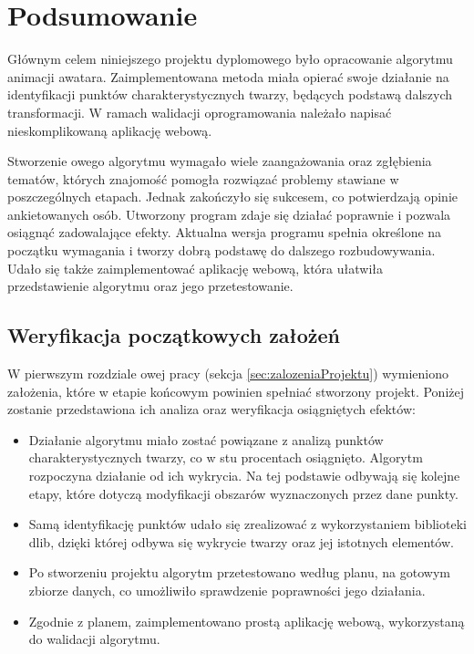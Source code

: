 \chapter{Podsumowanie}
\label{cha:podsumowanie}
Głównym celem niniejszego projektu dyplomowego było opracowanie algorytmu animacji awatara. Zaimplementowana metoda miała opierać swoje działanie na identyfikacji punktów charakterystycznych twarzy, będących podstawą dalszych transformacji. W ramach walidacji oprogramowania należało napisać nieskomplikowaną aplikację webową.

Stworzenie owego algorytmu wymagało wiele zaangażowania oraz zgłębienia tematów, których znajomość pomogła rozwiązać problemy stawiane w poszczególnych etapach. Jednak zakończyło się sukcesem, co potwierdzają opinie ankietowanych osób.  Utworzony program zdaje się działać poprawnie i pozwala osiągnąć zadowalające efekty. Aktualna wersja programu spełnia określone na początku wymagania i tworzy dobrą podstawę do dalszego rozbudowywania. Udało się także zaimplementować aplikację webową, która ułatwiła przedstawienie algorytmu oraz jego przetestowanie. 


\section{Weryfikacja początkowych założeń}
W pierwszym rozdziale owej pracy (sekcja \ref{sec:zalozeniaProjektu}) wymieniono założenia, które w etapie końcowym powinien spełniać stworzony projekt. Poniżej zostanie przedstawiona ich analiza oraz weryfikacja osiągniętych efektów:

\begin{itemize}
    \item Działanie algorytmu miało zostać powiązane z analizą punktów charakterystycznych twarzy, co w stu procentach osiągnięto. Algorytm rozpoczyna działanie od ich wykrycia. Na tej podstawie odbywają się kolejne etapy, które dotyczą modyfikacji obszarów wyznaczonych przez dane punkty.
    \item Samą identyfikację punktów udało się zrealizować z wykorzystaniem biblioteki dlib, dzięki której odbywa się wykrycie twarzy oraz jej istotnych elementów. 
    \item Po stworzeniu projektu algorytm przetestowano według planu, na gotowym zbiorze danych, co umożliwiło sprawdzenie poprawności jego działania.
    \item Zgodnie z planem, zaimplementowano prostą aplikację webową, wykorzystaną do walidacji algorytmu. %
\end{itemize}

